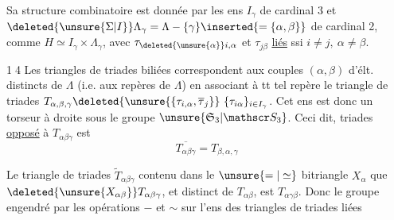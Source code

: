 Sa structure combinatoire est donnée par les ens $I_{\gamma}$ de cardinal 3 et $\deleted{\unsure{\Sigma|I}}\Lambda_{\gamma}=\Lambda-\{\gamma\}\inserted{=\{\alpha,\beta\}}$ de cardinal 2, comme $H\simeq I_{\gamma}\times\Lambda_{\gamma}$, avec $\tau_{\deleted{\unsure{\alpha}}i,\alpha}$ et $\tau_{j\beta}$ \uline{liés} ssi $i\ne j,\ \alpha\ne\beta$. 


\textcircled{14} Les triangles de triades biliées correspondent aux couples $(\alpha,\beta)$ d'élt. distincts de $\Lambda$ (i.e. aux repères de $\Lambda$) en associant à tt tel repère le  triangle de triades $T_{\alpha,\beta,\gamma}\deleted{\unsure{\{\tau_{i,\alpha},\overline{\tau}_{j}}}\ \{\tau_{i\alpha}\}_{i\in I_{\gamma}}$. Cet ens est donc un torseur à droite sous le groupe $\unsure{\mathfrak S_3|\mathscr S_3}$. Ceci dit,   triades \uline{opposé} à $T_{\alpha\beta\gamma}$ est
\[
\overline{T_{\alpha\beta\gamma}}=T_{\beta,\alpha,\gamma}
\]

Le triangle de triades $\widetilde T_{\alpha\beta\gamma}$  contenu dans le $\unsure{=|\simeq}$ bitriangle $X_\alpha$ que $\deleted{\unsure{X_{\alpha\beta}}}T_{\alpha\beta\gamma}$, et distinct de $T_{\alpha\beta}$, est $T_{\alpha\gamma\beta}$. Donc le groupe engendré par les opérations $-$ et $\sim$ sur l'ens des triangles de triades liées


